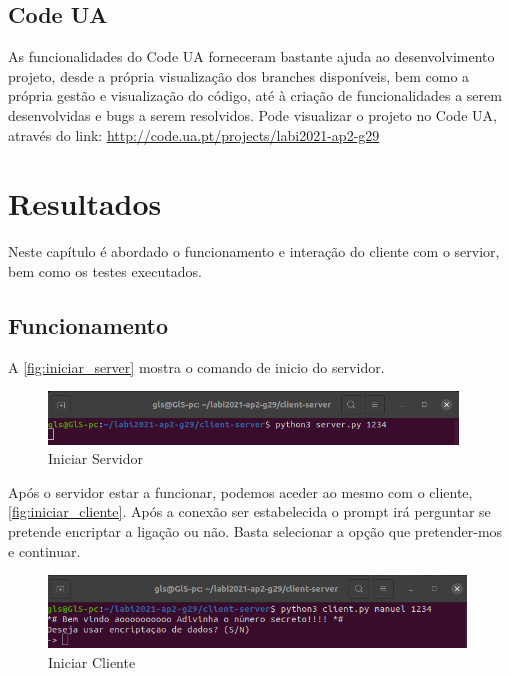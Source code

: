 \documentclass{report}
\begin{document}
\section{Code UA}
\label{sec:code_ua}
As funcionalidades do Code UA forneceram bastante ajuda ao desenvolvimento projeto, desde a própria visualização dos branches disponíveis, bem como a própria gestão e visualização do código, até à criação de funcionalidades a serem desenvolvidas e bugs a serem resolvidos. Pode visualizar o projeto no Code UA, através do link: \url{http://code.ua.pt/projects/labi2021-ap2-g29}


\chapter{Resultados}
\label{chap.resultados}

Neste capítulo é abordado o funcionamento e interação do cliente com o servior, bem como os testes executados.

\section{Funcionamento}
\label{sec:funcionamento}

A \autoref{fig:iniciar_server} mostra o comando de inicio do servidor.

\begin{figure}[!h]
\center 
\includegraphics[height=40pt]{img/fotos_resultado/iniciar_server.png}
\caption{Iniciar Servidor}
\label{fig:iniciar_server}
\end{figure}

Após o servidor estar a funcionar, podemos aceder ao mesmo com o cliente,  \autoref{fig:iniciar_cliente}. Após a conexão ser estabelecida o prompt irá perguntar se pretende encriptar a ligação ou não. Basta selecionar a opção que pretender-mos e continuar.

\begin{figure}[!h]
\center 
\includegraphics[height=55pt]{img/fotos_resultado/iniciar_client.png}
\caption{Iniciar Cliente}
\label{fig:iniciar_cliente}
\end{figure}
\end{document}

